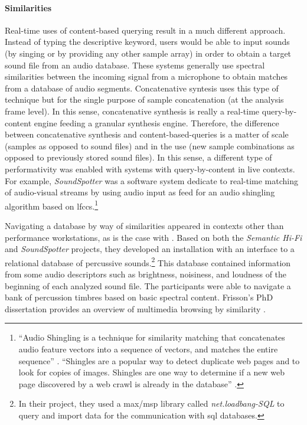 {	\paragraph{Similarities}
	Real-time uses of content-based querying result in a much different approach. Instead of typing the descriptive keyword, users would be able to input sounds (by singing or by providing any other sample array) in order to obtain a target sound file from an audio database. These systems generally use spectral similarities between the incoming signal from a microphone to obtain matches from a database of audio segments. Concatenative syntesis uses this type of technique but for the single purpose of sample concatenation (at the analysis frame level). In this sense, concatenative synthesis is really a real-time query-by-content engine feeding a granular synthesis engine. Therefore, the difference between concatenative synthesis and content-based-queries is a matter of scale (samples as opposed to sound files) and in the use (new sample combinations as opposed to previously stored sound files). In this sense, a different type of performativity was enabled with systems with query-by-content in live contexts. For example, \textit{SoundSpotter} \parencite{DBLP:conf/icmc/CaseyG07} was a software system dedicate to real-time matching of audio-visual streams by using audio input as feed for an audio shingling algorithm based on \glspl{lfcc}.\footnote{``Audio Shingling is a technique for similarity matching that concatenates audio feature vectors into a sequence of vectors, and matches the entire sequence'' \parencite{DBLP:conf/icmc/CaseyG07}. ``Shingles are a popular way to detect duplicate web pages and to look for copies of images. Shingles are one way to determine if a new web page discovered by a web crawl is already in the database'' \parencite{DBLP:conf/ismir/CaseyS06}.}


	Navigating a database by way of similarities appeared in contexts other than performance workstations, as is the case with \cite{Price2008}. Based on both the \textit{Semantic Hi-Fi} and \textit{SoundSpotter} projects, they developed an installation with an interface to a relational database of percussive sounds.\footnote{In their project, they used a \gls{max/msp} library called \textit{net.loadbang-SQL} to query and import data for the communication with \gls{sql} databases.} This database contained information from some audio descriptors such as brightness, noisiness, and loudness of the beginning of each analyzed sound file. The participants were able to navigate a bank of percussion timbres based on basic spectral content. Frisson's PhD dissertation provides an overview of multimedia browsing by similarity \parencite{Frisson2015}.

}
